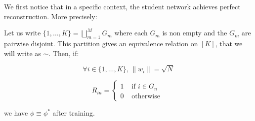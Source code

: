 We first notice that in a specific context, the student network achieves perfect reconstruction. More precisely:


\begin{proposition} \label{prop:perfectrec}
    Let us write $\{1,\dots,K\} = \bigsqcup \limits_{m = 1}^M G_m $ where each $G_m$ is non empty and the $G_m$ are pairwise disjoint. This partition gives an equivalence relation on $[K]$, that we will write as $\sim$. Then, if:

    \begin{equation} \label{eqn:hyponw}
    \forall i \in \{1,\dots,K\} \text{, } \lVert w_i \rVert = \sqrt{N}
    \end{equation}

    \begin{equation} \label{eqn:hyponR}
    R_{in} = \begin{cases}
    1 & \text{ if } i \in G_n\\
    0 & \text{ otherwise } 
    \end{cases}
    \end{equation}

    we have $\phi \equiv \phi^*$ after training.
\end{proposition}

